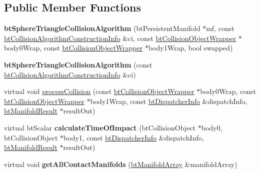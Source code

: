 \subsection*{Public Member Functions}
\begin{DoxyCompactItemize}
\item 
\hypertarget{classbt_sphere_triangle_collision_algorithm_a278144bf8f19f8d1873ef2c9f6c6667c}{{\bfseries bt\+Sphere\+Triangle\+Collision\+Algorithm} (bt\+Persistent\+Manifold $\ast$mf, const \hyperlink{structbt_collision_algorithm_construction_info}{bt\+Collision\+Algorithm\+Construction\+Info} \&ci, const \hyperlink{structbt_collision_object_wrapper}{bt\+Collision\+Object\+Wrapper} $\ast$body0\+Wrap, const \hyperlink{structbt_collision_object_wrapper}{bt\+Collision\+Object\+Wrapper} $\ast$body1\+Wrap, bool swapped)}\label{classbt_sphere_triangle_collision_algorithm_a278144bf8f19f8d1873ef2c9f6c6667c}

\item 
\hypertarget{classbt_sphere_triangle_collision_algorithm_ad21f16e3d6cd90274a39f34e8feef9bf}{{\bfseries bt\+Sphere\+Triangle\+Collision\+Algorithm} (const \hyperlink{structbt_collision_algorithm_construction_info}{bt\+Collision\+Algorithm\+Construction\+Info} \&ci)}\label{classbt_sphere_triangle_collision_algorithm_ad21f16e3d6cd90274a39f34e8feef9bf}

\item 
virtual void \hyperlink{classbt_sphere_triangle_collision_algorithm_af6de517d0a45abb91df4f61c5867c8f1}{process\+Collision} (const \hyperlink{structbt_collision_object_wrapper}{bt\+Collision\+Object\+Wrapper} $\ast$body0\+Wrap, const \hyperlink{structbt_collision_object_wrapper}{bt\+Collision\+Object\+Wrapper} $\ast$body1\+Wrap, const \hyperlink{structbt_dispatcher_info}{bt\+Dispatcher\+Info} \&dispatch\+Info, \hyperlink{classbt_manifold_result}{bt\+Manifold\+Result} $\ast$result\+Out)
\item 
\hypertarget{classbt_sphere_triangle_collision_algorithm_a28edb37215536a08a99371e72b86f182}{virtual bt\+Scalar {\bfseries calculate\+Time\+Of\+Impact} (bt\+Collision\+Object $\ast$body0, bt\+Collision\+Object $\ast$body1, const \hyperlink{structbt_dispatcher_info}{bt\+Dispatcher\+Info} \&dispatch\+Info, \hyperlink{classbt_manifold_result}{bt\+Manifold\+Result} $\ast$result\+Out)}\label{classbt_sphere_triangle_collision_algorithm_a28edb37215536a08a99371e72b86f182}

\item 
\hypertarget{classbt_sphere_triangle_collision_algorithm_a5f222156d65a50624295f00542ccd56f}{virtual void {\bfseries get\+All\+Contact\+Manifolds} (\hyperlink{classbt_aligned_object_array}{bt\+Manifold\+Array} \&manifold\+Array)}\label{classbt_sphere_triangle_collision_algorithm_a5f222156d65a50624295f00542ccd56f}

\end{DoxyCompactItemize}
